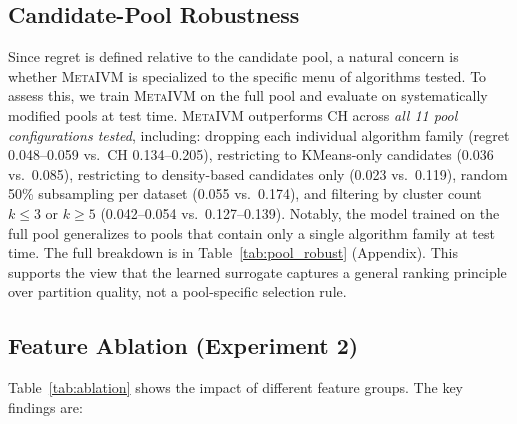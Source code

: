 \documentclass[10pt]{article} %
\newcommand{\ours}{\textsc{MetaIVM}}
\begin{document}
\subsection{Candidate-Pool Robustness}
\label{sec:pool_robust}

Since regret is defined relative to the candidate pool, a natural concern is whether \ours{} is specialized to the specific menu of algorithms tested. To assess this, we train \ours{} on the full pool and evaluate on systematically modified pools at test time. \ours{} outperforms CH across \emph{all 11 pool configurations tested}, including: dropping each individual algorithm family (regret 0.048--0.059 vs.\ CH 0.134--0.205), restricting to KMeans-only candidates (0.036 vs.\ 0.085), restricting to density-based candidates only (0.023 vs.\ 0.119), random 50\% subsampling per dataset (0.055 vs.\ 0.174), and filtering by cluster count $k \leq 3$ or $k \geq 5$ (0.042--0.054 vs.\ 0.127--0.139). Notably, the model trained on the full pool generalizes to pools that contain only a single algorithm family at test time. The full breakdown is in Table~\ref{tab:pool_robust} (Appendix). This supports the view that the learned surrogate captures a general ranking principle over partition quality, not a pool-specific selection rule.

\subsection{Feature Ablation (Experiment 2)}

Table~\ref{tab:ablation} shows the impact of different feature groups. The key findings are:
\end{document}
